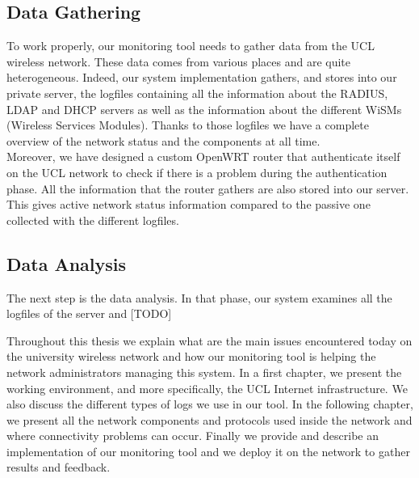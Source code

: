 \subsection{Data Gathering}

To work properly, our monitoring tool needs to gather data from the UCL wireless network. These data comes from various places and are quite heterogeneous. Indeed, our system implementation gathers, and stores into our private server, the logfiles containing all the information about the RADIUS, LDAP and DHCP servers as well as the information about the different WiSMs (Wireless Services Modules). Thanks to those logfiles we have a complete overview of the network status and the components at all time.\\

Moreover, we have designed a custom OpenWRT router that authenticate itself on the UCL network to check if there is a problem during the authentication phase. All the information that the router gathers are also stored into our server. This gives active network status information compared to the passive one collected with the different logfiles.


\subsection{Data Analysis}
The next step is the data analysis. In that phase, our system examines all the logfiles of the server and [TODO]




Throughout this thesis we explain what are the main issues encountered today on the university wireless network and how our monitoring tool is helping the network administrators managing this system. In a first chapter, we present the working environment, and more specifically, the UCL Internet infrastructure. We also discuss the different types of logs we use in our tool. In the following chapter, we present all the network components and protocols used inside the network and where connectivity problems can occur. Finally we provide and describe an implementation of our monitoring tool and we deploy it on the network to gather results and feedback.
